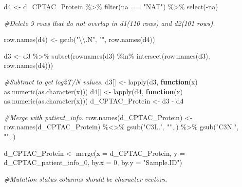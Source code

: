 \documentclass[
]{article}
\newenvironment{Shaded}{\begin{snugshade}}{\end{snugshade}}
\newcommand{\AttributeTok}[1]{\textcolor[rgb]{0.77,0.63,0.00}{#1}}
\newcommand{\CommentTok}[1]{\textcolor[rgb]{0.56,0.35,0.01}{\textit{#1}}}
\newcommand{\ControlFlowTok}[1]{\textcolor[rgb]{0.13,0.29,0.53}{\textbf{#1}}}
\newcommand{\DecValTok}[1]{\textcolor[rgb]{0.00,0.00,0.81}{#1}}
\newcommand{\FunctionTok}[1]{\textcolor[rgb]{0.00,0.00,0.00}{#1}}
\newcommand{\NormalTok}[1]{#1}
\newcommand{\OtherTok}[1]{\textcolor[rgb]{0.56,0.35,0.01}{#1}}
\newcommand{\SpecialCharTok}[1]{\textcolor[rgb]{0.00,0.00,0.00}{#1}}
\newcommand{\StringTok}[1]{\textcolor[rgb]{0.31,0.60,0.02}{#1}}
\begin{document}
\begin{Shaded}
\begin{Highlighting}[]
\NormalTok{d4 }\OtherTok{\textless{}{-}}\NormalTok{ d\_CPTAC\_Protein }\SpecialCharTok{\%\textgreater{}\%} 
  \FunctionTok{filter}\NormalTok{(na }\SpecialCharTok{==} \StringTok{"NAT"}\NormalTok{) }\SpecialCharTok{\%\textgreater{}\%} 
  \FunctionTok{select}\NormalTok{(}\SpecialCharTok{{-}}\NormalTok{na)}

\CommentTok{\#Delete 9 rows that do not overlap in d1(110 rows) and d2(101 rows).}

\FunctionTok{row.names}\NormalTok{(d4) }\OtherTok{\textless{}{-}} \FunctionTok{gsub}\NormalTok{(}\StringTok{"}\SpecialCharTok{\textbackslash{}\textbackslash{}}\StringTok{.N"}\NormalTok{, }\StringTok{""}\NormalTok{, }\FunctionTok{row.names}\NormalTok{(d4)) }

\NormalTok{d3 }\OtherTok{\textless{}{-}}\NormalTok{ d3 }\SpecialCharTok{\%\textgreater{}\%} 
  \FunctionTok{subset}\NormalTok{(}\FunctionTok{rownames}\NormalTok{(d3) }\SpecialCharTok{\%in\%} \FunctionTok{intersect}\NormalTok{(}\FunctionTok{row.names}\NormalTok{(d3), }\FunctionTok{row.names}\NormalTok{(d4)))}

\CommentTok{\#Subtract to get log2T/N values.}
\NormalTok{d3[] }\OtherTok{\textless{}{-}} \FunctionTok{lapply}\NormalTok{(d3, }\ControlFlowTok{function}\NormalTok{(x) }\FunctionTok{as.numeric}\NormalTok{(}\FunctionTok{as.character}\NormalTok{(x)))}
\NormalTok{d4[] }\OtherTok{\textless{}{-}} \FunctionTok{lapply}\NormalTok{(d4, }\ControlFlowTok{function}\NormalTok{(x) }\FunctionTok{as.numeric}\NormalTok{(}\FunctionTok{as.character}\NormalTok{(x)))}
\NormalTok{d\_CPTAC\_Protein }\OtherTok{\textless{}{-}}\NormalTok{ d3 }\SpecialCharTok{{-}}\NormalTok{ d4}


\CommentTok{\#Merge with patient\_info.}
\FunctionTok{row.names}\NormalTok{(d\_CPTAC\_Protein) }\OtherTok{\textless{}{-}} \FunctionTok{row.names}\NormalTok{(d\_CPTAC\_Protein) }\SpecialCharTok{\%\textless{}\textgreater{}\%} 
  \FunctionTok{gsub}\NormalTok{(}\StringTok{"C3L."}\NormalTok{, }\StringTok{""}\NormalTok{,.) }\SpecialCharTok{\%\textgreater{}\%}
  \FunctionTok{gsub}\NormalTok{(}\StringTok{"C3N."}\NormalTok{, }\StringTok{""}\NormalTok{,.)}

\NormalTok{d\_CPTAC\_Protein }\OtherTok{\textless{}{-}} \FunctionTok{merge}\NormalTok{(}\AttributeTok{x =}\NormalTok{ d\_CPTAC\_Protein, }\AttributeTok{y =}\NormalTok{ d\_CPTAC\_patient\_info\_0, }\AttributeTok{by.x =} \DecValTok{0}\NormalTok{, }\AttributeTok{by.y =} \StringTok{"Sample.ID"}\NormalTok{)}

\CommentTok{\#Mutation status columns should be \textquotesingle{}character\textquotesingle{} vectors.}


\end{Highlighting}
\end{Shaded}
\end{document}
